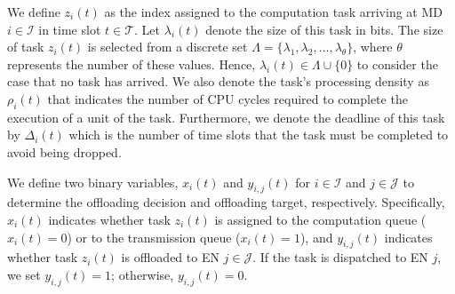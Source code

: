 \documentclass[12pt,draftclsnofoot,onecolumn]{IEEEtran}
\begin{document}
We define $z_i(t)$ as the index assigned to the computation task arriving at MD $i \in \mathcal{I}$ in time slot $t \in \mathcal{T}$. Let $\lambda_i(t)$ denote the size of this task in bits. The size of task $z_i(t)$ is selected from a discrete set $\Lambda = \{\lambda_1, \lambda_2, \ldots, \lambda_{\theta}\}$, where $\theta$ represents the number of these values. Hence, $\lambda_i(t) \in \Lambda \cup \{0\}$ to consider the case that no task has arrived. We also denote the task's processing density as $\rho_i(t)$ that indicates the number of CPU cycles required to complete the execution of a unit of the task. Furthermore, we denote the deadline of this task by $\Delta_i(t)$ which is the number of time slots that the task must be completed to avoid being dropped.

We define two binary variables, $x_i(t)$ and $y_{i,j}(t)$ for $i \in \mathcal{I}$ and $j \in \mathcal{J}$ to determine the offloading decision and offloading target, respectively. Specifically, $x_i(t)$ indicates whether task $z_i(t)$ is assigned to the computation queue ($x_i(t) = 0$) or to the transmission queue ($x_i(t) = 1$), and $y_{i,j}(t)$ indicates whether task $z_i(t)$ is offloaded to EN $j \in \mathcal{J}$. If the task is dispatched to EN $j$, we set $y_{i,j}(t) = 1$; otherwise, $y_{i,j}(t) = 0$.
\end{document}
